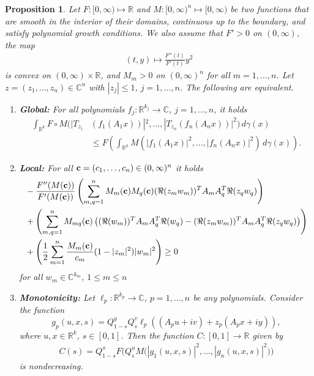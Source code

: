 \documentclass[9pt, a4paper]{amsart}
\newcommand{\R}{\mathbb{R}}
\newcommand{\C}{\mathbb{C}}
\newcommand{\1}{{\chi_{}}}%
\newtheorem{proposition}{Proposition}
\numberwithin{equation}{section}
\begin{document}
\begin{proposition}\label{equivalComplex}
Let $F :[0,\infty) \mapsto \mathbb{R}$ and $M: [0,\infty)^{n} \mapsto [0,\infty)$ be two functions that are smooth in the interior of their domains, continuous up to the boundary,  and satisfy polynomial growth conditions. We also assume that $F'>0$ on $(0,\infty)$, the map 
\begin{align}\label{lemmaConvF}
(t,y) \mapsto \frac{F''(t)}{F'(t)}y^{2}
\end{align}
is convex on $(0,\infty)\times \mathbb{R}$, and 
 $M_{m}>0$ on $(0, \infty)^{n}$ for all $m=1, \ldots, n$.    Let $z=(z_{1}, \ldots, z_{n}) \in \mathbb{C}^{n}$ with $|z_{j}|\leq 1$, $j=1, \ldots, n$. The following are equivalent.
\vspace{0.2cm}
\begin{enumerate}
\item \label{Globalcomplex} \textbf{Global:} For all polynomials $f_j:\R^{k_j}\to\C$, $j=1, \ldots, n$,  it holds
\vspace{0.2cm}
\begin{align*}
\int_{\R^k}F\circ M(|T_{z_1}&(f_1(A_1 x))|^2, \ldots, |T_{z_n}(f_n( A_n x))|^2) \,d\gamma(x)\\
&\leq F\left(	\int_{\R^k}M(|f_1(A_1 x)|^2, \ldots, |f_n(A_n x)|^2)\,d\gamma(x)\right).
\end{align*}  
\vspace{0.2cm}
\item \label{Localcomplex}\textbf{Local:}  For all ${\bf{c}}=(c_{1},\ldots, c_{n})\in (0,\infty)^n$ it holds
\vspace{0.2cm}
\begin{align*}
		&-\frac{F''(M({\bf{c}}))}{F'(M({\bf{c}}))}\left(\sum_{m, q=1}^{n} M_{m}({\bf{c}})M_{q}({\bf{c}})  (\Re(z_mw_{m}))^T A_{m} A_{q}^T  \Re(z_qw_{q}) \right)\\
		&+\left(\sum_{m, q=1}^{n}  M_{mq}({\bf{c}}) \left( (\Re(w_{m}))^T A_{m} A_{q}^T  \Re(w_{q})  -  (\Re(z_mw_{m}))^T A_{m} A_{q}^T  \Re(z_qw_{q}) \right) \right)\\
		&+\left(\frac{1}{2}\sum_{m=1}^n\frac{M_{m}({\bf{c}})}{c_m}(1-|z_m|^2) 
		|w_{m}|^2\right)\geq0
	\end{align*}
	for all $w_{m}\in\C^{k_m}$, $1\leq m\leq n$
\vspace{0.2cm}
\item \label{monotonicitycomplex} \textbf{Monotonicity:} Let $\ell_p:\R^{k_p}\to\mathbb{C}$, $p=1,\ldots,n$ be any polynomials. Consider the function 
\begin{equation}\label{gforComplex}
g_p(u,x,s)=Q_{1-s}^yQ_s^v\ell_p((A_p u+iv)+z_p(A_p x+iy)),
\end{equation}
where $u,x\in\R^k$, $s\in[0,1]$. Then the function $C:[0,1]\to \R$ given by 
\begin{align}\label{4Hflows}
C(s)=Q_{1-s}^x F\big(Q_s^uM\big(|g_1(u,x,s)|^2,\ldots,|g_n(u,x,s)|^2)\big)
\end{align}
is nondecreasing. 
\vspace{0.2cm}
\end{enumerate} 
\end{proposition}	
\end{document}
